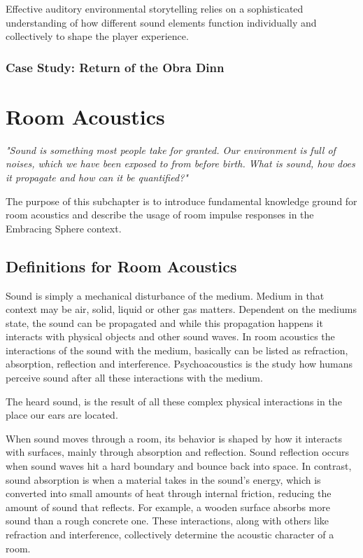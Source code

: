             Effective auditory environmental storytelling relies on a sophisticated understanding of how different sound elements function individually and collectively to shape the player experience.\par

            \subsubsection{Case Study: Return of the Obra Dinn}
            \section{Room Acoustics}
        \emph{"Sound is something most people take for granted. Our environment is full of noises, which we have been exposed to from before birth. What is sound, how does it propagate and how can it be quantified\cite{Acoustics_and_Psychophysics}?"}\par 

        The purpose of this subchapter is to introduce fundamental knowledge ground for room acoustics and describe the usage of room impulse responses in the Embracing Sphere context.\par
        \subsection{Definitions for Room Acoustics}
            Sound is simply a mechanical disturbance of the medium. Medium in that context may be air, solid, liquid or other gas matters. Dependent on the mediums state, the sound can be propagated and while this propagation happens it interacts with physical objects and other sound waves. In room acoustics the interactions of the sound with the medium, basically can be listed as refraction, absorption, reflection and interference. Psychoacoustics is the study how humans perceive sound after all these interactions with the medium\cite{Acoustics_and_Psychophysics}.\par

            The heard sound, is the result of all these complex physical interactions in the place our ears are located.\par

            When sound moves through a room, its behavior is shaped by how it interacts with surfaces, mainly through absorption and reflection. Sound reflection occurs when sound waves hit a hard boundary and bounce back into space. In contrast, sound absorption is when a material takes in the sound's energy, which is converted into small amounts of heat through internal friction, reducing the amount of sound that reflects\cite{Acoustics_and_Psychophysics}. For example, a wooden surface absorbs more sound than a rough concrete one. These interactions, along with others like refraction and interference, collectively determine the acoustic character of a room.\par


